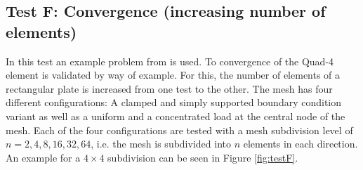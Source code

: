  \subsection{Test F: Convergence (increasing number of elements)}\label{sec:valid-F}
  In this test an example problem from \cite{macneal1985proposed} is used. To convergence of the Quad-4 element is validated by way of example. For this, the number of elements of a rectangular plate is increased from one test to the other. The mesh has four different configurations: A clamped and simply supported boundary condition variant as well as a uniform and a concentrated load at the central node of the mesh. Each of the four configurations are tested with a mesh subdivision level of $n={2,4,8,16,32,64}$, i.e. the mesh is subdivided into $n$ elements in each direction. An example for a $4\!\times\!4$ subdivision can be seen in Figure \ref{fig:testF}.
  
